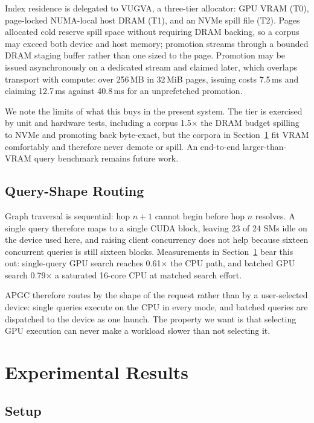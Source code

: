 \documentclass[11pt,twocolumn]{article}
\begin{document}
Index residence is delegated to VUGVA, a three-tier allocator: GPU VRAM (T0),
page-locked NUMA-local host DRAM (T1), and an NVMe spill file (T2). Pages
allocated cold reserve spill space without requiring DRAM backing, so a corpus
may exceed both device and host memory; promotion streams through a bounded
DRAM staging buffer rather than one sized to the page. Promotion may be issued
asynchronously on a dedicated stream and claimed later, which overlaps transport
with compute: over 256\,MB in 32\,MiB pages, issuing costs 7.5\,ms and claiming
12.7\,ms against 40.8\,ms for an unprefetched promotion.

We note the limits of what this buys in the present system. The tier is
exercised by unit and hardware tests, including a corpus 1.5$\times$ the DRAM
budget spilling to NVMe and promoting back byte-exact, but the corpora in
Section~\ref{sec:results} fit VRAM comfortably and therefore never demote or
spill. An end-to-end larger-than-VRAM query benchmark remains future work.

\subsection{Query-Shape Routing}
\label{sec:routing}

Graph traversal is sequential: hop $n{+}1$ cannot begin before hop $n$
resolves. A single query therefore maps to a single CUDA block, leaving 23 of 24
SMs idle on the device used here, and raising client concurrency does not help
because sixteen concurrent queries is still sixteen blocks. Measurements in
Section~\ref{sec:results} bear this out: single-query GPU search reaches
0.61$\times$ the CPU path, and batched GPU search 0.79$\times$ a saturated
16-core CPU at matched search effort.

APGC therefore routes by the shape of the request rather than by a
user-selected device: single queries execute on the CPU in every mode, and
batched queries are dispatched to the device as one launch. The property we want
is that selecting GPU execution can never make a workload slower than not
selecting it.

\section{Experimental Results}
\label{sec:results}

\subsection{Setup}
\label{sec:setup}
\end{document}
